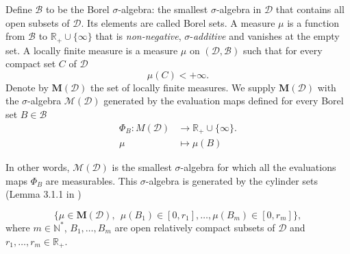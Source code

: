 \documentclass[twoside,11pt]{book}
\numberwithin{theorem}{chapter}
\numberwithin{definition}{chapter}
\numberwithin{proposition}{chapter}
\numberwithin{corollary}{chapter}
\numberwithin{example}{chapter}
\numberwithin{lemma}{chapter}
\numberwithin{assumption}{chapter}
\begin{document}
Define $\mathcal{B}$ to be the Borel $\sigma$-algebra: the smallest $\sigma$-algebra in $\mathcal{D}$ that contains all open subsets of $\mathcal{D}$. Its elements are called Borel sets. A measure $\mu$ is a function from $\mathcal{B}$ to $\mathbb{R}_{+} \cup \{\infty \}$ that is \emph{non-negative}, $\sigma$-\emph{additive} and vanishes at the empty set. A locally finite measure is a measure $\mu$ on $(\mathcal{D},\mathcal{B})$ such that for every compact set $C$ of $\mathcal{D}$
\begin{equation}
\mu(C) <+\infty.
\end{equation}
Denote by $\mathbf{M}(\mathcal{D})$ the set of locally finite measures.
We supply $\mathbf{M}(\mathcal{D})$ with the $\sigma$-algebra $\mathcal{M}(\mathcal{D})$ generated by the evaluation maps defined for every Borel set $B \in \mathcal{B}$
\begin{align}
\Phi_{B}: M(\mathcal{D}) &\rightarrow \mathbb{R}_{+}\cup \{\infty \}. \nonumber\\
\mu & \mapsto \mu(B) \nonumber
\end{align}

In other words, $\mathcal{M}(\mathcal{D})$ is the smallest $\sigma$-algebra for which all the evaluations maps $\Phi_{B}$ are measurables. This $\sigma$-algebra is generated by the cylinder sets (Lemma 3.1.1 in \citep{ScWe08})

\begin{equation}
\Big\{ \mu \in \mathbf{M}(\mathcal{D}), \:\: \mu(B_{1}) \in [0,r_1], \dots, \mu(B_{m}) \in [0,r_m] \Big\},
\end{equation}
where $m \in \mathbb{N}^{*}$, $B_{1}, \dots, B_{m}$ are open relatively compact subsets of $\mathcal{D}$ and $r_{1}, \dots, r_{m} \in \mathbb{R}_{+}$.
\end{document}
